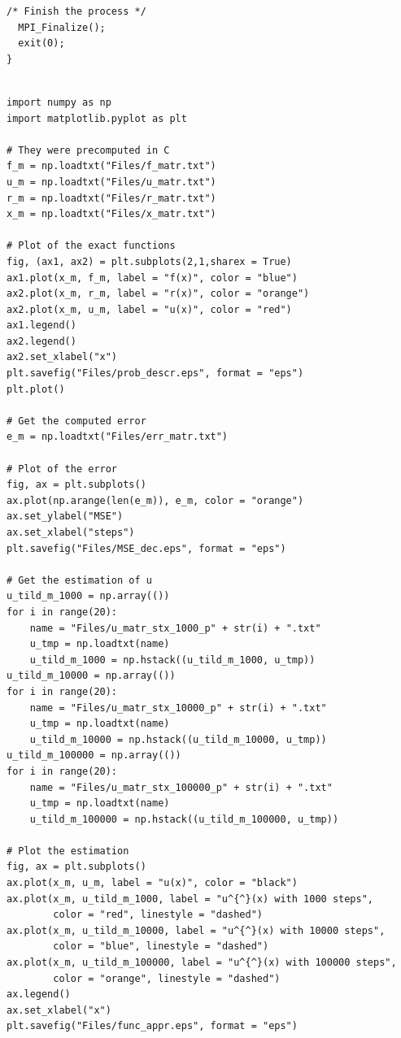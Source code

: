 \documentclass{article}
\begin{document}
\begin{enumerate}
\begin{lstlisting}[style=customc, caption={MPI implementation of an ODE solver using Jacobi iteration process}, label={lst:ode_jacobi}]
  /* Finish the process */
  MPI_Finalize();
  exit(0);
}
\end{lstlisting}

\begin{lstlisting}[style=custompy, caption={Reading the files and printing}, label={lst:printing_jacobi}]

import numpy as np
import matplotlib.pyplot as plt

# They were precomputed in C
f_m = np.loadtxt("Files/f_matr.txt")
u_m = np.loadtxt("Files/u_matr.txt")
r_m = np.loadtxt("Files/r_matr.txt")
x_m = np.loadtxt("Files/x_matr.txt")

# Plot of the exact functions
fig, (ax1, ax2) = plt.subplots(2,1,sharex = True)
ax1.plot(x_m, f_m, label = "f(x)", color = "blue")
ax2.plot(x_m, r_m, label = "r(x)", color = "orange")
ax2.plot(x_m, u_m, label = "u(x)", color = "red")
ax1.legend()
ax2.legend()
ax2.set_xlabel("x")
plt.savefig("Files/prob_descr.eps", format = "eps")
plt.plot()

# Get the computed error 
e_m = np.loadtxt("Files/err_matr.txt")

# Plot of the error
fig, ax = plt.subplots()
ax.plot(np.arange(len(e_m)), e_m, color = "orange")
ax.set_ylabel("MSE")
ax.set_xlabel("steps")
plt.savefig("Files/MSE_dec.eps", format = "eps")

# Get the estimation of u
u_tild_m_1000 = np.array(())
for i in range(20):
    name = "Files/u_matr_stx_1000_p" + str(i) + ".txt"
    u_tmp = np.loadtxt(name)
    u_tild_m_1000 = np.hstack((u_tild_m_1000, u_tmp))
u_tild_m_10000 = np.array(())
for i in range(20):
    name = "Files/u_matr_stx_10000_p" + str(i) + ".txt"
    u_tmp = np.loadtxt(name)
    u_tild_m_10000 = np.hstack((u_tild_m_10000, u_tmp))
u_tild_m_100000 = np.array(())
for i in range(20):
    name = "Files/u_matr_stx_100000_p" + str(i) + ".txt"
    u_tmp = np.loadtxt(name)
    u_tild_m_100000 = np.hstack((u_tild_m_100000, u_tmp))

# Plot the estimation
fig, ax = plt.subplots()
ax.plot(x_m, u_m, label = "u(x)", color = "black")
ax.plot(x_m, u_tild_m_1000, label = "u^{^}(x) with 1000 steps", 
        color = "red", linestyle = "dashed")
ax.plot(x_m, u_tild_m_10000, label = "u^{^}(x) with 10000 steps", 
        color = "blue", linestyle = "dashed")
ax.plot(x_m, u_tild_m_100000, label = "u^{^}(x) with 100000 steps", 
        color = "orange", linestyle = "dashed")
ax.legend()
ax.set_xlabel("x")
plt.savefig("Files/func_appr.eps", format = "eps")
\end{lstlisting}


\end{enumerate}
\end{document}
